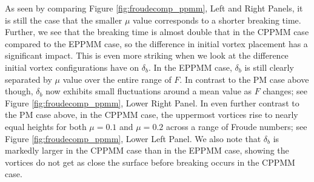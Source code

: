 \documentclass[a4paper,11pt]{article}
\begin{document}
As seen by comparing Figure \ref{fig:froudecomp_ppmm}, Left and Right Panels, it is still the case that the smaller $\mu$ value corresponds to a shorter breaking time.  Further, we see that the breaking time is almost double that in the CPPMM case compared to the EPPMM case, so the difference in initial vortex placement has a significant impact.  This is even more striking when we look at the difference initial vortex configurations have on $\delta_{b}$.  In the EPPMM case, $\delta_{b}$ is still clearly separated by $\mu$ value over the entire range of $F$.  In contrast to the PM case above though, $\delta_{b}$ now exhibits small fluctuations around a mean value as $F$ changes; see Figure \ref{fig:froudecomp_ppmm}, Lower Right Panel.  In even further contrast to the PM case above, in the CPPMM case, the uppermost vortices rise to nearly equal heights for both $\mu=0.1$ and $\mu=0.2$ across a range of Froude numbers; see Figure \ref{fig:froudecomp_ppmm}, Lower Left Panel.  We also note that $\delta_{b}$ is markedly larger in the CPPMM case than in the EPPMM case, showing the vortices do not get as close the surface before breaking occurs in the CPPMM case. 
%
\end{document}
